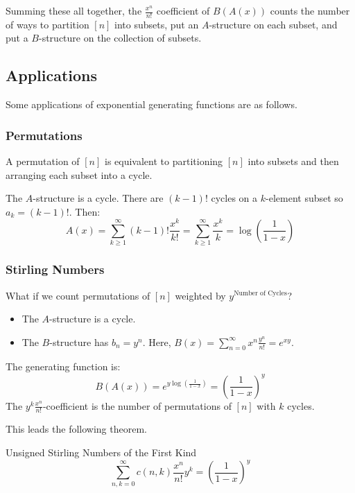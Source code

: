 \documentclass[letterpaper]{article}
\begin{document}
Summing these all together, the $\frac{x^n}{n!}$ coefficient of $B(A(x))$ counts the number of ways to partition $[n]$ into subsets, put an $A$-structure on each subset, and put a $B$-structure on the collection of subsets.

\subsection{Applications}
Some applications of exponential generating functions are as follows. 

\subsubsection{Permutations}
A permutation of $[n]$ is equivalent to partitioning $[n]$ into subsets and then arranging each subset into a cycle. 

\bigskip 

The $A$-structure is a cycle. There are $(k - 1)!$ cycles on a $k$-element subset so $a_k = (k - 1)!$. Then:
\[A(x) = \sum_{k \geq 1}^{\infty} (k - 1)! \frac{x^k}{k!} = \sum_{k \geq 1}^{\infty} \frac{x^k}{k} = \log\left(\frac{1}{1 - x}\right)\]

\subsubsection{Stirling Numbers}
What if we count permutations of $[n]$ weighted by $y^{\text{Number of Cycles}}$?
\begin{itemize}
    \item The $A$-structure is a cycle. 
    \item The $B$-structure has $b_n = y^n$. Here, $B(x) = \sum_{n = 0}^{\infty} x^n \frac{y^n}{n!} = e^{xy}$. 
\end{itemize}
The generating function is:
\[B(A(x)) = e^{y\log(\frac{1}{1 - x})} = \left(\frac{1}{1 - x}\right)^y\]
The $y^k \frac{x^n}{n!}$-coefficient is the number of permutations of $[n]$ with $k$ cycles.  

\bigskip 

This leads the following theorem.
\begin{theorem}{Unsigned Stirling Numbers of the First Kind}{}
    \[\sum_{n, k = 0}^{\infty} c(n, k) \frac{x^n}{n!} y^k = \left(\frac{1}{1 - x}\right)^y\]
\end{theorem}
\end{document}
